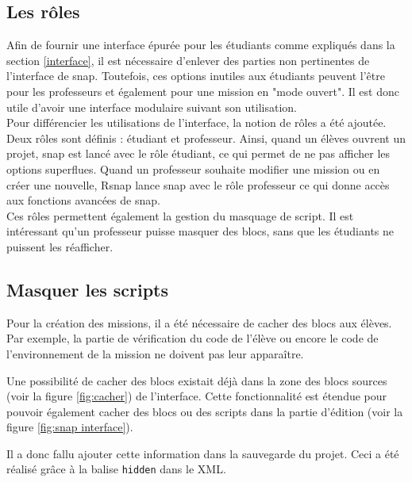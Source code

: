 \subsection{Les rôles}
\label{role}
Afin de fournir une interface épurée pour les étudiants comme expliqués dans la section \ref{interface}, il est nécessaire d'enlever des parties non pertinentes de l'interface de \gls{snap}. Toutefois, ces options inutiles aux étudiants peuvent l'être pour les professeurs et également pour une mission en "mode ouvert". Il est donc utile d'avoir une interface modulaire suivant son utilisation. \\

Pour différencier les utilisations de l'interface, la notion de rôles a été ajoutée. Deux rôles sont définis : étudiant et professeur. Ainsi, quand un élèves ouvrent un projet, \gls{snap} est lancé avec le rôle étudiant, ce qui permet de ne pas afficher les options superflues. Quand un professeur souhaite modifier une mission ou en créer une nouvelle, \gls{Rsnap} lance \gls{snap} avec le rôle professeur ce qui donne accès aux fonctions avancées de \gls{snap}.\\

Ces rôles permettent également la gestion du masquage de script. Il est intéressant qu'un professeur puisse masquer des \glspl{bloc}, sans que les étudiants ne puissent les réafficher.

\subsection{Masquer les scripts}
Pour la création des missions, il a été nécessaire de cacher des \glspl{bloc} aux élèves. Par exemple, la partie de vérification du code de l'élève ou encore le code de l'environnement de la mission ne doivent pas leur apparaître.

Une possibilité de cacher des \glspl{bloc} existait déjà dans la zone des \glspl{bloc} sources (voir la figure \ref{fig:cacher}) de l'interface. Cette fonctionnalité est étendue pour pouvoir également cacher des \glspl{bloc} ou des scripts dans la partie d'édition (voir la figure \ref{fig:snap interface}).

Il a donc fallu ajouter cette information dans la sauvegarde du projet. Ceci a été réalisé grâce à la balise \texttt{hidden} dans le XML.\\



